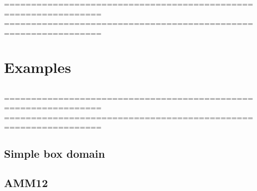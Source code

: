 %
================================================================
%
================================================================
\chapter{Examples}
\label{eq}

$\ $\newline    %



%
\noindent ================================================================
%
================================================================

\section{Simple box domain}
\label{box}

\section{AMM12}
\label{amm}



